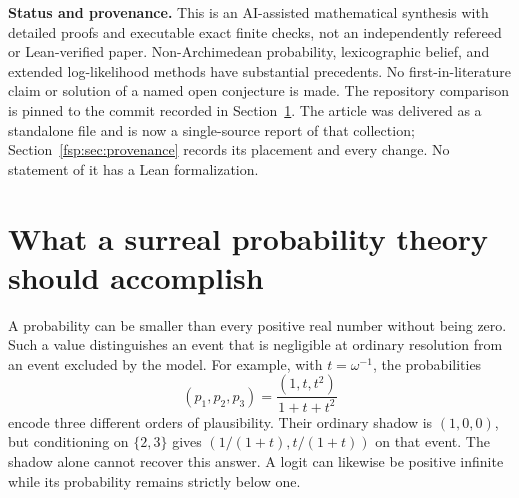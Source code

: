 \documentclass[11pt,a4paper]{article}
\numberwithin{equation}{section}
\theoremstyle{definition}
\theoremstyle{remark}
\begin{document}
\begin{titlepage}
\begin{minipage}{0.96\textwidth}
\begin{abstract}
Infinite sample spaces require additional structure rather than a change of
scalar field alone. We distinguish strong Hahn summation, coefficientwise
countable additivity, and regular finitely additive probabilities obtained
from ultrafilters or ordered-field compactness. We construct diffuse
hierarchical probabilities and posterior kernels, prove two elementary
obstructions to coefficientwise independent sampling, and give a regular
all-subsets extension theorem after a set-sized field enlargement. An
uncountable-support example shows that naive coefficientwise integration can
send a pointwise positive surreal-valued function to a negative number.
Standard-part and nonstandard/Loeb bridges are treated separately. Throughout,
finite algebraic identities, support-controlled series, and probabilistic
limit theorems are kept distinct.
\end{abstract}
\end{minipage}
\vfill
\begin{minipage}{0.96\textwidth}
\small
\textbf{Status and provenance.} This is an AI-assisted mathematical synthesis
with detailed proofs and executable exact finite checks, not an independently
refereed or Lean-verified paper. Non-Archimedean probability, lexicographic
belief, and extended log-likelihood methods have substantial precedents.
No first-in-literature claim or solution of a named open conjecture is made.
The repository comparison is pinned to the commit recorded in
Section~\ref{fsp:sec:position}. The article was delivered as a standalone
file and is now a single-source report of that collection;
Section~\ref{fsp:sec:provenance} records its placement and every change.
No statement of it has a Lean formalization.
\end{minipage}
\end{titlepage}
\hypersetup{pageanchor=true}
{\small\setlength{\parskip}{0pt}\tableofcontents}
\clearpage{}

\section{What a surreal probability theory should accomplish}
\label{fsp:sec:position}

A probability can be smaller than every positive real number without being
zero. Such a value distinguishes an event that is negligible at ordinary
resolution from an event excluded by the model. For example, with
$t=\omega^{-1}$, the probabilities
\begin{equation}\label{fsp:eq:intro}
 (p_1,p_2,p_3)=\frac{(1,t,t^2)}{1+t+t^2}
\end{equation}
encode three different orders of plausibility. Their ordinary shadow is
$(1,0,0)$, but conditioning on $\{2,3\}$ gives
$(1/(1+t),t/(1+t))$ on that event. The shadow alone cannot recover this answer.
A logit can likewise be positive infinite while its probability remains
strictly below one.
\end{document}
